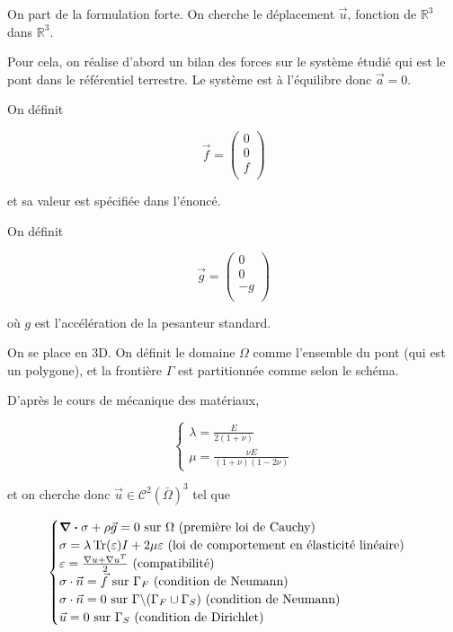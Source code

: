 On part de la formulation forte. On cherche le déplacement $\vec{u}$, fonction de $\mathbb{R}^3$ dans $\mathbb{R}^3$.

Pour cela, on réalise d'abord un bilan des forces sur le système étudié qui est le pont dans le référentiel terrestre. Le système est à l'équilibre donc $\vec{a} = 0$.

On définit

\begin{equation}
    \vec{f} = \begin{pmatrix} 0\\ 0\\ f\\\end{pmatrix}
\end{equation}

et sa valeur est spécifiée dans l'énoncé.

On définit 

\begin{equation}
    \vec{g} = \begin{pmatrix} 0\\ 0\\ -g\\\end{pmatrix}
\end{equation}

où $g$ est l'accélération de la pesanteur standard.

On se place en 3D. On définit le domaine $\Omega$ comme l'ensemble du pont (qui est un polygone), et la frontière $\Gamma$ est partitionnée comme selon le schéma.

D'après le cours de mécanique des matériaux,

\begin{equation}
    \begin{cases}
        \lambda = \frac{E}{2(1+\nu)}\\
        \mu = \frac{\nu E}{(1+\nu)(1-2\nu)}
    \end{cases}
\end{equation}

et on cherche donc $\vec{u} \in \mathcal{C}^2(\bar{\Omega})^3$ tel que

\begin{equation}\label{fort}
    \begin{cases}
      \div \sigma + \rho \vec{g} = 0 \textrm { sur $\Omega$ (première loi de Cauchy)} \\
      \sigma = \lambda \operatorname{Tr} (\varepsilon) I + 2 \mu \varepsilon \textrm { (loi de comportement en élasticité linéaire)} \\
      \varepsilon=\frac{\nabla u + \nabla u^T }{2} \textrm { (compatibilité)} \\
      \sigma \cdot \vec{n} = \vec{f}\textrm { sur $\Gamma_F$ (condition de Neumann)} \\
      \sigma \cdot \vec{n} = 0\textrm { sur $\Gamma \backslash (\Gamma_F \cup \Gamma_S) $ (condition de Neumann)} \\
      \vec{u} = 0 \textrm { sur $\Gamma_S$ (condition de Dirichlet)} \\
      
    \end{cases}
\end{equation}

